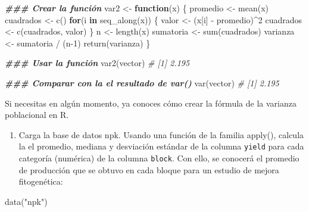 \documentclass[
]{article}
\newenvironment{Shaded}{\begin{snugshade}}{\end{snugshade}}
\newcommand{\CommentTok}[1]{\textcolor[rgb]{0.56,0.35,0.01}{\textit{#1}}}
\newcommand{\ControlFlowTok}[1]{\textcolor[rgb]{0.13,0.29,0.53}{\textbf{#1}}}
\newcommand{\DecValTok}[1]{\textcolor[rgb]{0.00,0.00,0.81}{#1}}
\newcommand{\DocumentationTok}[1]{\textcolor[rgb]{0.56,0.35,0.01}{\textbf{\textit{#1}}}}
\newcommand{\FunctionTok}[1]{\textcolor[rgb]{0.00,0.00,0.00}{#1}}
\newcommand{\NormalTok}[1]{#1}
\newcommand{\OtherTok}[1]{\textcolor[rgb]{0.56,0.35,0.01}{#1}}
\newcommand{\SpecialCharTok}[1]{\textcolor[rgb]{0.00,0.00,0.00}{#1}}
\newcommand{\StringTok}[1]{\textcolor[rgb]{0.31,0.60,0.02}{#1}}
\providecommand{\tightlist}{%
  \setlength{\itemsep}{0pt}\setlength{\parskip}{0pt}}
\theoremstyle{definition}
\theoremstyle{definition}
\theoremstyle{definition}
\theoremstyle{definition}
\theoremstyle{remark}
\begin{document}
\begin{Shaded}
\begin{Highlighting}[]
\DocumentationTok{\#\#\# Crear la función}
\NormalTok{var2 }\OtherTok{\textless{}{-}} \ControlFlowTok{function}\NormalTok{(x) \{}
\NormalTok{  promedio }\OtherTok{\textless{}{-}} \FunctionTok{mean}\NormalTok{(x)}
\NormalTok{  cuadrados }\OtherTok{\textless{}{-}} \FunctionTok{c}\NormalTok{()}
  \ControlFlowTok{for}\NormalTok{(i }\ControlFlowTok{in} \FunctionTok{seq\_along}\NormalTok{(x)) \{}
\NormalTok{    valor }\OtherTok{\textless{}{-}}\NormalTok{ (x[i] }\SpecialCharTok{{-}}\NormalTok{ promedio)}\SpecialCharTok{\^{}}\DecValTok{2}
\NormalTok{    cuadrados }\OtherTok{\textless{}{-}} \FunctionTok{c}\NormalTok{(cuadrados, valor)}
\NormalTok{  \}}
\NormalTok{  n }\OtherTok{\textless{}{-}} \FunctionTok{length}\NormalTok{(x)}
\NormalTok{  sumatoria }\OtherTok{\textless{}{-}} \FunctionTok{sum}\NormalTok{(cuadrados)}
\NormalTok{  varianza }\OtherTok{\textless{}{-}}\NormalTok{ sumatoria }\SpecialCharTok{/}\NormalTok{ (n}\DecValTok{{-}1}\NormalTok{)}
  \FunctionTok{return}\NormalTok{(varianza)}
\NormalTok{\}}

\DocumentationTok{\#\#\# Usar la función}
\FunctionTok{var2}\NormalTok{(vector)}
\CommentTok{\# [1] 2.195}

\DocumentationTok{\#\#\# Comparar con la el resultado de var()}
\FunctionTok{var}\NormalTok{(vector)}
\CommentTok{\# [1] 2.195}
\end{Highlighting}
\end{Shaded}

Si necesitas en algún momento, ya conoces cómo crear la fórmula de la varianza poblacional en R.

\begin{enumerate}
\def\labelenumi{\arabic{enumi}.}
\tightlist
\item
  Carga la base de datos npk. Usando una función de la familia apply(), calcula la el promedio, mediana y desviación estándar de la columna \texttt{yield} para cada categoría (numérica) de la columna \texttt{block}. Con ello, se conocerá el promedio de producción que se obtuvo en cada bloque para un estudio de mejora fitogenética:
\end{enumerate}

\begin{Shaded}
\begin{Highlighting}[]
\FunctionTok{data}\NormalTok{(}\StringTok{"npk"}\NormalTok{)}
\end{Highlighting}
\end{Shaded}
\end{document}
